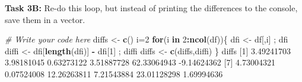 \documentclass[
]{book}
\newenvironment{Shaded}{\begin{snugshade}}{\end{snugshade}}
\newcommand{\CommentTok}[1]{\textcolor[rgb]{0.56,0.35,0.01}{\textit{#1}}}
\newcommand{\ControlFlowTok}[1]{\textcolor[rgb]{0.13,0.29,0.53}{\textbf{#1}}}
\newcommand{\DecValTok}[1]{\textcolor[rgb]{0.00,0.00,0.81}{#1}}
\newcommand{\FloatTok}[1]{\textcolor[rgb]{0.00,0.00,0.81}{#1}}
\newcommand{\KeywordTok}[1]{\textcolor[rgb]{0.13,0.29,0.53}{\textbf{#1}}}
\newcommand{\NormalTok}[1]{#1}
\newcommand{\OperatorTok}[1]{\textcolor[rgb]{0.81,0.36,0.00}{\textbf{#1}}}
\newcommand{\StringTok}[1]{\textcolor[rgb]{0.31,0.60,0.02}{#1}}
\begin{document}
\begin{Shaded}
\end{Shaded}

\textbf{Task 3B:} Re-do this loop, but instead of printing the differences to the console, save them in a vector.

\begin{Shaded}
\begin{Highlighting}[]
\CommentTok{# Write your code here}
\NormalTok{diffs <-}\StringTok{ }\KeywordTok{c}\NormalTok{()}
\NormalTok{i=}\DecValTok{2}
\ControlFlowTok{for}\NormalTok{(i }\ControlFlowTok{in} \DecValTok{2}\OperatorTok{:}\KeywordTok{ncol}\NormalTok{(df))\{}
\NormalTok{  dfi <-}\StringTok{ }\NormalTok{df[,i] ; dfi}
\NormalTok{  diffi <-}\StringTok{ }\NormalTok{dfi[}\KeywordTok{length}\NormalTok{(dfi)] }\OperatorTok{-}\StringTok{ }\NormalTok{dfi[}\DecValTok{1}\NormalTok{] ; diffi}
\NormalTok{  diffs <-}\StringTok{ }\KeywordTok{c}\NormalTok{(diffs,diffi)}
\NormalTok{\}}
\NormalTok{diffs}
\NormalTok{ [}\DecValTok{1}\NormalTok{]  }\FloatTok{3.49241703}  \FloatTok{3.98181045}  \FloatTok{0.63273122}  \FloatTok{3.51887728} \FloatTok{62.33064943} \FloatTok{-9.14624362}
\NormalTok{ [}\DecValTok{7}\NormalTok{]  }\FloatTok{4.73004321}  \FloatTok{0.07524008} \FloatTok{12.26263811}  \FloatTok{7.21543884} \FloatTok{23.01128298}  \FloatTok{1.69994636}
\end{Highlighting}
\end{Shaded}
\end{document}
